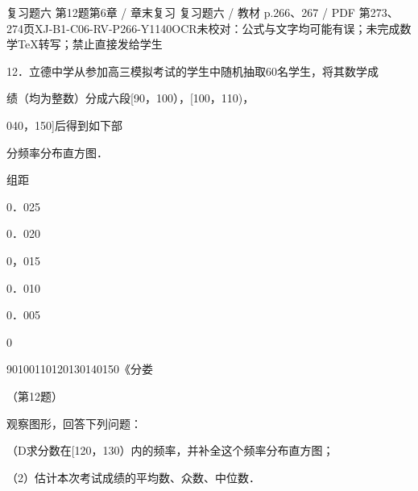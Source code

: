 \begin{bankitem}{复习题六 第12题}{第6章 / 章末复习 复习题六 / 教材 p.266、267 / PDF 第273、274页}{XJ-B1-C06-RV-P266-Y1140}{OCR未校对：公式与文字均可能有误；未完成数学TeX转写；禁止直接发给学生}
\begin{ocrdraft}
\par
12．立德中学从参加高三模拟考试的学生中随机抽取60名学生，将其数学成
\par
绩（均为整数）分成六段[90，100），[100，110)，
\par
040，150]后得到如下部
\par
分频率分布直方图．
\par
组距
\par
0．025
\par
0．020
\par
0，015
\par
0．010
\par
0．005
\par
0
\par
90100110120130140150《分娄
\par
（第12题）
\par
[教材p.267 / PDF第274页]
\par
观察图形，回答下列问题：
\par
（D求分数在[120，130）内的频率，并补全这个频率分布直方图；
\par
（2）估计本次考试成绩的平均数、众数、中位数．
\end{ocrdraft}
\end{bankitem}
